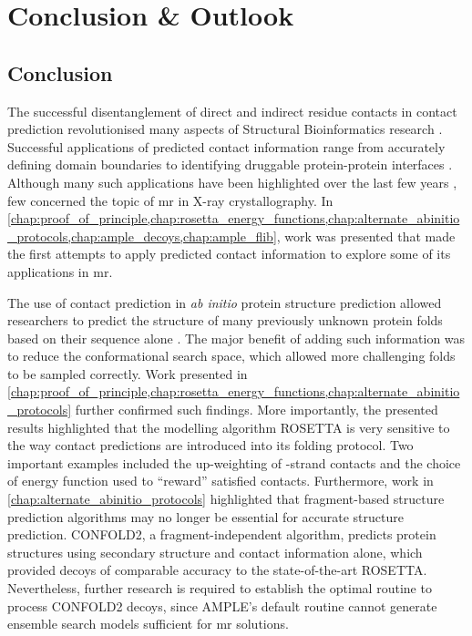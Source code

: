 \chapter{Conclusion \& Outlook}
\clearpage

\section{Conclusion}
The successful disentanglement of direct and indirect residue contacts in contact prediction revolutionised many aspects of Structural Bioinformatics research \cite{Simkovic2017-xs}. Successful applications of predicted contact information range from accurately defining domain boundaries \cite{Sadowski2013-zu} to identifying druggable protein-protein interfaces \cite{Bai2016-sw}. Although many such applications have been highlighted over the last few years \cite{Simkovic2017-xs}, few concerned the topic of \gls{mr} in X-ray crystallography. In \cref{chap:proof_of_principle,chap:rosetta_energy_functions,chap:alternate_abinitio_protocols,chap:ample_decoys,chap:ample_flib}, work was presented that made the first attempts to apply predicted contact information to explore some of its applications in \gls{mr}.

The use of contact prediction in \textit{ab initio} protein structure prediction allowed researchers to predict the structure of many previously unknown protein folds based on their sequence alone \cite[e.g.,][]{Marks2011-os,Michel2014-eg,Kosciolek2014-bt,Ovchinnikov2015-tn,Ovchinnikov2016-jj,Michel2017-xh,De_Oliveira2018-sg,Ovchinnikov2017-nd,Wang2017-rx}. The major benefit of adding such information was to reduce the conformational search space, which allowed more challenging folds to be sampled correctly. Work presented in \cref{chap:proof_of_principle,chap:rosetta_energy_functions,chap:alternate_abinitio_protocols} further confirmed such findings. More importantly, the presented results highlighted that the modelling algorithm ROSETTA is very sensitive to the way contact predictions are introduced into its folding protocol. Two important examples included the up-weighting of \textbeta-strand contacts and the choice of energy function used to ``reward'' satisfied contacts. Furthermore, work in \cref{chap:alternate_abinitio_protocols} highlighted that fragment-based structure prediction algorithms may no longer be essential for accurate structure prediction. CONFOLD2, a fragment-independent algorithm, predicts protein structures using secondary structure and contact information alone, which provided decoys of comparable accuracy to the state-of-the-art ROSETTA. Nevertheless, further research is required to establish the optimal routine to process CONFOLD2 decoys, since AMPLE's default routine cannot generate ensemble search models sufficient for \gls{mr} solutions.

